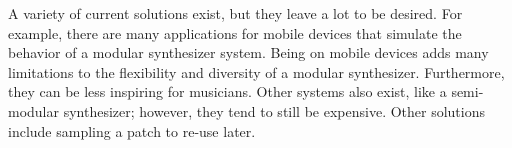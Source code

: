    A variety of current solutions exist, but they leave a lot to be desired.
    For example, there are many applications for mobile devices that simulate the behavior of a modular synthesizer system.
    Being on mobile devices adds many limitations to the flexibility and diversity of a modular synthesizer. Furthermore, they can be less inspiring for musicians.
    Other systems also exist, like a semi-modular synthesizer; however, they tend to still be expensive.
    Other solutions include sampling a patch to re-use later.
    
    
    
